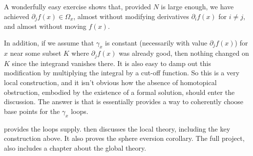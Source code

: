 A wonderfully easy exercise shows that, provided $N$ is large enough,
we have achieved $∂_j f(x) ∈ Ω_x$, almost without modifying
derivatives $∂_i f(x)$ for $i ≠ j$, and almost without moving
$f(x)$.

In addition, if we assume that $γ_x$ is constant (necessarily with value
$∂_j f(x)$) for $x$ near some subset $K$ where
$∂_j f(x)$ was already good, then nothing changed on $K$ since the
integrand vanishes there. It is also easy to damp out this modification
by multiplying the integral by a cut-off function. So this is a very
local construction, and it isn't obvious how the absence of homotopical
obstruction, embodied by the existence of a formal solution, should
enter the discussion. The answer is that is essentially provides a way
to coherently choose base points for the $γ_x$ loops.

 provides the loops supply.  then
discusses the local theory, including the key construction above.
It also proves the sphere eversion corollary. The full project, also
includes a chapter about the global theory.

